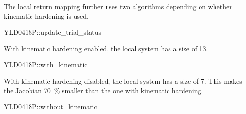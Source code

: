 The local return mapping further uses two algorithms depending on whether kinematic hardening is used.
\begin{cppcode}
YLD0418P::update_trial_status
\end{cppcode}

With kinematic hardening enabled, the local system has a size of \num{13}.
\begin{cppcode}
YLD0418P::with_kinematic
\end{cppcode}

With kinematic hardening disabled, the local system has a size of \num{7}.
This makes the Jacobian \SI{70}{\percent} smaller than the one with kinematic hardening.
\begin{cppcode}
YLD0418P::without_kinematic
\end{cppcode}
